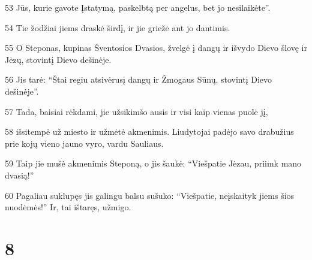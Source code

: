 \par 53 Jūs, kurie gavote Įstatymą, paskelbtą per angelus, bet jo nesilaikėte”. 
\par 54 Tie žodžiai jiems draskė širdį, ir jie griežė ant jo dantimis. 
\par 55 O Steponas, kupinas Šventosios Dvasios, žvelgė į dangų ir išvydo Dievo šlovę ir Jėzų, stovintį Dievo dešinėje. 
\par 56 Jis tarė: “Štai regiu atsivėrusį dangų ir Žmogaus Sūnų, stovintį Dievo dešinėje”. 
\par 57 Tada, baisiai rėkdami, jie užsikimšo ausis ir visi kaip vienas puolė jį, 
\par 58 išsitempė už miesto ir užmėtė akmenimis. Liudytojai padėjo savo drabužius prie kojų vieno jauno vyro, vardu Sauliaus. 
\par 59 Taip jie mušė akmenimis Steponą, o jis šaukė: “Viešpatie Jėzau, priimk mano dvasią!” 
\par 60 Pagaliau suklupęs jis galingu balsu sušuko: “Viešpatie, neįskaityk jiems šios nuodėmės!” Ir, tai ištaręs, užmigo.


\chapter{8}


